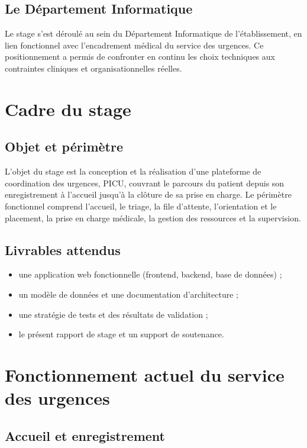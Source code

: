 \subsection{Le Département Informatique}

Le stage s'est déroulé au sein du Département Informatique de l'établissement, en lien fonctionnel avec l'encadrement médical du service des urgences. Ce positionnement a permis de confronter en continu les choix techniques aux contraintes cliniques et organisationnelles réelles.

\section{Cadre du stage}

\subsection{Objet et périmètre}

L'objet du stage est la conception et la réalisation d'une plateforme de coordination des urgences, PICU, couvrant le parcours du patient depuis son enregistrement à l'accueil jusqu'à la clôture de sa prise en charge. Le périmètre fonctionnel comprend l'accueil, le triage, la file d'attente, l'orientation et le placement, la prise en charge médicale, la gestion des ressources et la supervision.

\subsection{Livrables attendus}

\begin{itemize}
    \item une application web fonctionnelle (frontend, backend, base de données) ;
    \item un modèle de données et une documentation d'architecture ;
    \item une stratégie de tests et des résultats de validation ;
    \item le présent rapport de stage et un support de soutenance.
\end{itemize}

\section{Fonctionnement actuel du service des urgences}

\subsection{Accueil et enregistrement}


